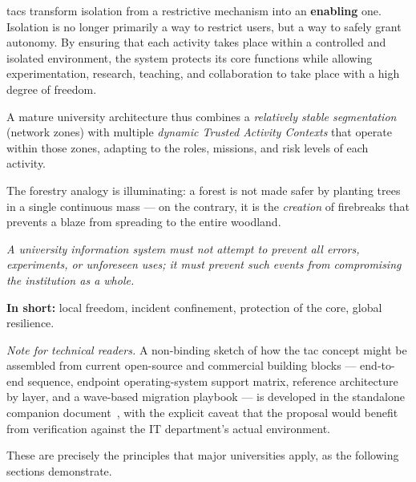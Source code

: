 \noindent
\gls{tac}s transform isolation from a restrictive mechanism into an
\textbf{enabling} one. Isolation is no longer primarily a way to
restrict users, but a way to safely grant autonomy. By ensuring that
each activity takes place within a controlled and isolated
environment, the system protects its core functions while allowing
experimentation, research, teaching, and collaboration to take place
with a high degree of freedom.

\medskip\noindent
A mature university architecture thus combines a \emph{relatively
stable segmentation} (network zones) with multiple \emph{dynamic
Trusted Activity Contexts} that operate within those zones,
adapting to the roles, missions, and risk levels of each activity.

\medskip
The forestry analogy is illuminating: a forest
is not made safer by planting trees in a single continuous mass --- on the
contrary, it is the \emph{creation} of firebreaks that
prevents a blaze from spreading to the entire woodland.

\begin{tcolorbox}[
    colback=NavyBlue!6!white,
    colframe=NavyBlue!80!black,
    boxrule=0.8pt,
    arc=2pt,
    left=10pt, right=10pt, top=8pt, bottom=8pt,
    title={\textbf{Guiding principle for a university information system}}
]
\itshape
A university information system must not attempt to prevent all errors,
experiments, or unforeseen uses; it must prevent such events from
compromising the institution as a whole.

\medskip
\upshape
\textbf{In short:} local freedom, incident confinement, protection of
the core, global resilience.
\end{tcolorbox}

\smallskip\noindent
\emph{Note for technical readers.} A non-binding sketch of how the
\gls{tac} concept might be assembled from current open-source and
commercial building blocks --- end-to-end sequence, endpoint
operating-system support matrix, reference architecture by layer, and
a wave-based migration playbook --- is developed in the standalone
companion document~\cite{ng-tech-ref-2026}, with the explicit caveat
that the proposal would benefit from verification against the IT
department's actual environment.

\medskip\noindent
These are precisely the principles that major universities apply,
as the following sections demonstrate.

